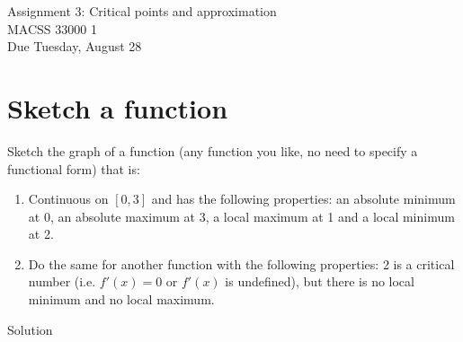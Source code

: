 \documentclass[12pt]{article}
\begin{document}
	\begin{center}
		Assignment 3: Critical points and approximation\\
        MACSS 33000 1 \\
		Due Tuesday, August 28 \\
	\end{center}
 
\section{Sketch a function}
Sketch the graph of a function (any function you like, no need to specify a functional form) that is:
\begin{enumerate}
    \item Continuous on $[0,3]$ and has the following properties: an absolute minimum at 0, an absolute maximum at 3, a local maximum at 1 and a local minimum at 2.
    \item Do the same for another function with the following properties: 2 is a critical number (i.e. $f'(x) = 0$ or $f'(x)$ is undefined), but there is no local minimum and no local maximum.
\end{enumerate}
Solution
\end{document}
